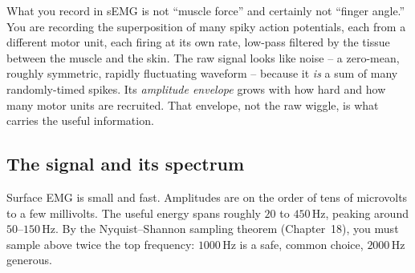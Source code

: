 \begin{happeningbox}
What you record in sEMG is not ``muscle force'' and certainly not
``finger angle.'' You are recording the superposition of many spiky action potentials,
each from a different motor unit, each firing at its own rate, low-pass filtered by
the tissue between the muscle and the skin. The raw signal looks like noise -- a
zero-mean, roughly symmetric, rapidly fluctuating waveform -- because it \emph{is} a
sum of many randomly-timed spikes. Its \emph{amplitude envelope} grows with how hard
and how many motor units are recruited. That envelope, not the raw wiggle, is what
carries the useful information.
\end{happeningbox}

\subsection{The signal and its spectrum}
\label{ch37:emg-signal}

Surface EMG is small and fast. Amplitudes are on the order of tens of microvolts to a
few millivolts. The useful energy spans roughly $20$ to $450$\,Hz, peaking around
$50$--$150$\,Hz. By the Nyquist--Shannon sampling theorem (Chapter~18), you must sample above
twice the top frequency: $1000$\,Hz is a safe, common choice, $2000$\,Hz generous.

